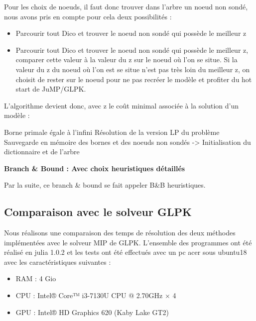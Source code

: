 \documentclass[a4paper,10pt]{article}
\begin{document}
Pour les choix de noeuds, il faut donc trouver dans l'arbre un noeud non sondé, nous avons pris en compte pour cela deux possibilités :
\begin{itemize}
\item Parcourir tout Dico et trouver le noeud non sondé qui possède le meilleur z
\item Parcourir tout Dico et trouver le noeud non sondé qui possède le meilleur z, comparer cette valeur à la valeur du z sur le noeud où l'on se situe. Si la valeur du z du noeud où l'on est se situe n'est pas très loin du meilleur z, on choisit de rester sur le noeud pour ne pas recréer le modèle et profiter du hot start de JuMP/GLPK.  
\end{itemize}

\newpage
L'algorithme devient donc, avec z le coût minimal associée à la solution d'un modèle : 


\begin{algorithm}[!h]
  \begin{small}
    \BlankLine\DontPrintSemicolon
    Borne primale égale à l'infini\;
    Résolution de la version LP du problème\;
    Sauvegarde en mémoire des bornes et des noeuds non sondés -> Initialisation du dictionnaire et de l'arbre \;
  \end{small}
  \caption{\textbf{Branch \& Bound : Avec choix heuristiques détaillés}}
\end{algorithm}

Par la suite, ce branch \& bound se fait appeler B\&B heuristiques.

\subsection{Comparaison avec le solveur GLPK}
Nous réalisons une comparaison des temps de résolution des deux méthodes implémentées avec le solveur MIP de GLPK.
L'ensemble des programmes ont été réalisé en julia 1.0.2 et les tests ont été effectués avec un pc acer sous ubuntu18 avec les caractéristiques suivantes : 
\begin{itemize}
\item RAM : 4 Gio
\item CPU : Intel® Core™ i3-7130U CPU @ 2.70GHz × 4 
\item GPU : Intel® HD Graphics 620 (Kaby Lake GT2)
\end{itemize}
\end{document}
